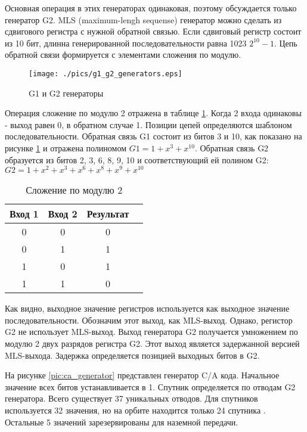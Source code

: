 Основная операция в этих генераторах одинаковая, поэтому обсуждается только генератор G2. MLS (maximum-lengh sequense)
генератор можно сделать из сдвигового регистра с нужной обратной связью. Если сдвиговый регистр состоит из 10 бит,
длинна генерированной последовательности равна 1023 ${2^{10}-1}$. Цепь обратной связи формируется с элементами сложения
по модулю.

\begin{figure}
\begin{center}
\texttt{[image: ./pics/g1\_g2\_generators.eps]}
\end{center}
\caption{G1 и G2 генераторы}
\label{pic:g1_g2_generators}
\end{figure}

Операция сложение по модулю 2 отражена в таблице \ref{tab:mod2}. Когда 2 входа одинаковы - выход равен 0, в обратном
случае 1. Позиции цепей определяются шаблоном последовательности. Обратная связь G1 состоит из битов 3 и 10, как 
показано на рисунке \ref{pic:g1_g2_generators} и отражена полиномом ${G1=1 + x^{3} + x^{10}}$. Обратная связь G2
образуется из битов 2, 3, 6, 8, 9, 10 и соответствующий ей полином G2:
${G2=1 + x^{2} + x^{3} + x^{6} + x^{8} + x^{9} + x^{10}}$ 

\begin{table}[H]
\begin{center}
\caption{Сложение по модулю 2}
\label{tab:mod2}
\begin{tabular}{|c|c|c|c|}
	\hline
		Вход 1 & Вход 2 & Результат \\
	\hline
		0 & 0 & 0 \\
	\hline
		0 & 1 & 1 \\
	\hline
		1 & 0 & 1 \\
	\hline
		1 & 1 & 0 \\
	\hline
\end{tabular}
\end{center}
\end{table}

Как видно, выходное значение регистров используется как выходное значение последовательности. Обозначим этот выход, как
MLS-выход. Однако, регистор G2 не использует MLS-выход. Выход генератора G2 получается умножением по модулю 2
двух разрядов регистра G2. Этот выход является задержанной версией MLS-выхода. Задержка определяется позицией выходных
битов в G2.

На рисунке \ref{pic:ca_generator} представлен генератор C/A кода. Начальное значение всех битов устанавливается в 1.
Спутник определяется по отводам G2 генератора. Всего существует 37 уникальных отводов. Для спутников используется 32
значения, но на орбите находится только 24 спутника \cite{tsui}. Остальные 5 значений зарезервированы для наземной
передачи.

